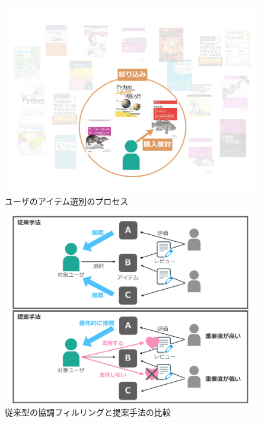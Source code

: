 \documentclass[a4paper,11pt,oneside,openany]{jsbook}
\begin{document}
\begin{figure}[htb]
	\begin{center} %
		\includegraphics[width = 120mm]{figures/item_selection.pdf} %
	\end{center}
	\caption{ユーザのアイテム選別のプロセス} %
	\label{fig:item_selection} %
\end{figure}
\begin{figure}[htb]
	\begin{center} %
		\includegraphics[width = 120mm]{figures/compare.pdf} %
	\end{center}
	\caption{従来型の協調フィルリングと提案手法の比較} %
	\label{fig:kyocho} %
\end{figure}
\end{document}
